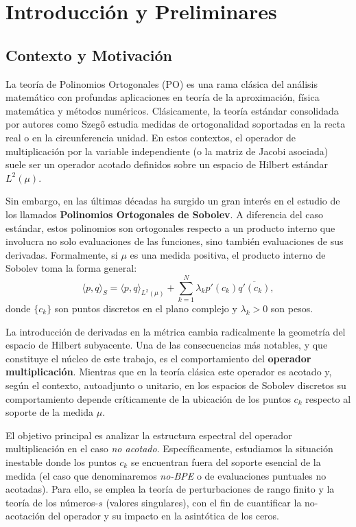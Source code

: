 
\chapter{Introducción y Preliminares}\label{sec:intro}

\section{Contexto y Motivación}

La teoría de Polinomios Ortogonales (PO) es una rama clásica del análisis matemático con profundas aplicaciones en teoría de la aproximación, física matemática y métodos numéricos. Clásicamente, la teoría estándar consolidada por autores como Szegő estudia medidas de ortogonalidad soportadas en la recta real o en la circunferencia unidad. En estos contextos, el operador de multiplicación por la variable independiente (o la matriz de Jacobi asociada) suele ser un operador acotado definidos sobre un espacio de Hilbert estándar $L^2(\mu)$.

Sin embargo, en las últimas décadas ha surgido un gran interés en el estudio de los llamados \textbf{Polinomios Ortogonales de Sobolev}. A diferencia del caso estándar, estos polinomios son ortogonales respecto a un producto interno que involucra no solo evaluaciones de las funciones, sino también evaluaciones de sus derivadas. Formalmente, si $\mu$ es una medida positiva, el producto interno de Sobolev toma la forma general:
\begin{equation}
	\langle p, q \rangle_S = \langle p, q \rangle_{L^2(\mu)} + \sum_{k=1}^N \lambda_k p'(c_k) \overline{q'(c_k)},
\end{equation}
donde $\{c_k\}$ son puntos discretos en el plano complejo y $\lambda_k > 0$ son pesos.

La introducción de derivadas en la métrica cambia radicalmente la geometría del espacio de Hilbert subyacente. Una de las consecuencias más notables, y que constituye el núcleo de este trabajo, es el comportamiento del \textbf{operador multiplicación}. Mientras que en la teoría clásica este operador es acotado y, según el contexto, autoadjunto o unitario, en los espacios de Sobolev discretos su comportamiento depende críticamente de la ubicación de los puntos $c_k$ respecto al soporte de la medida $\mu$.

El objetivo principal es analizar la estructura espectral del operador multiplicación en el caso \textit{no acotado}. Específicamente, estudiamos la situación inestable donde los puntos $c_k$ se encuentran fuera del soporte esencial de la medida (el caso que denominaremos \textit{no-BPE} o de evaluaciones puntuales no acotadas). Para ello, se emplea la teoría de perturbaciones de rango finito y la teoría de los números-$s$ (valores singulares), con el fin de cuantificar la no-acotación del operador y su impacto en la asintótica de los ceros.

